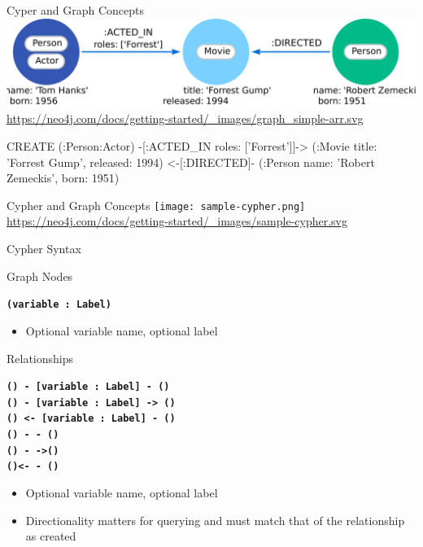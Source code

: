 \documentclass[ignorenonframetext,xcolor=x11names]{beamer}
\begin{document}
\begin{frame}[fragile]{Cyper and Graph Concepts}
\centering
\includegraphics[width=\textwidth]{graph_simple-arr.png}
\tiny{\url{https://neo4j.com/docs/getting-started/_images/graph_simple-arr.svg}} \\
\vspace{\baselineskip}

\begin{cyphercode}
CREATE (:Person:Actor)
         -[:ACTED_IN {roles: ['Forrest']}]->
       (:Movie {title: 'Forrest Gump', released: 1994})
         <-[:DIRECTED]-
       (:Person {name: 'Robert Zemeckis', born: 1951})
\end{cyphercode}
\end{frame}

\begin{frame}{Cypher and Graph Concepts}
\centering
\texttt{[image: sample-cypher.png]}
\tiny{\url{https://neo4j.com/docs/getting-started/_images/sample-cypher.svg}}
\end{frame}


\begin{frame}[fragile]{Cypher Syntax}
\begin{block}{Graph Nodes}
\centering

\textbf{\texttt{(variable : Label)}}

\begin{itemize}
  \item Optional variable name, optional label
\end{itemize}
\end{block}

\begin{block}{Relationships}
\centering

\textbf{\texttt{\;\;() - [variable : Label] - ()\;\;}} \\
\textbf{\texttt{\;\;() - [variable : Label] -> ()}} \\
\textbf{\texttt{() <- [variable : Label] - ()\;\;}} \\
\textbf{\texttt{\;\;() - - ()}\;\;} \\
\textbf{\texttt{() - ->()}}  \\
\textbf{\texttt{\;()<- - ()\;}} \\

\begin{itemize}
  \item Optional variable name, optional label
  \item Directionality matters for querying and must match that of the relationship as created
\end{itemize}
\end{block}

\end{frame}
\end{document}
